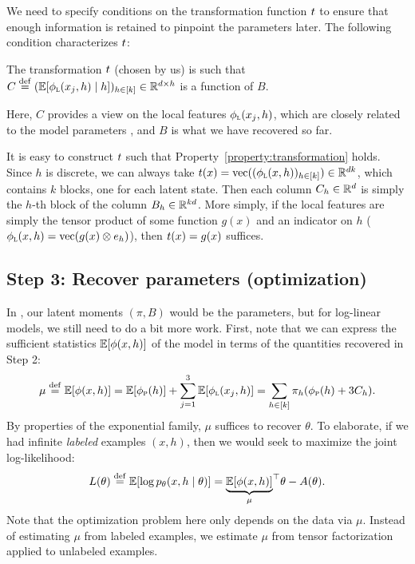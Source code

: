 We need to specify conditions on the transformation function $t$
to ensure that enough information is retained to pinpoint the parameters later.
The following condition characterizes $t$:
\begin{property}
  \label{property:transformation}
  The transformation $t$ (chosen by us) is such that $C \stackrel{\rm def}{=}
  (\mathbb{E}[\phi_\text{\sc l}(x_j, h) \mid h])_{h \in [k]} \in \mathbb{R}^{d \times h}$ is a
  function of $B$.
\end{property}
Here, $C$ provides a view on the local features $\phi_\text{\sc l}(x_j,h)$,
which are
closely related to the model parameters ,
and $B$ is what we have recovered so far.

It is easy to construct $t$ such that Property~\ref{property:transformation} holds.
Since $h$ is discrete,
we can always take $t(x) = \text{vec}((\phi_\text{\sc l}(x, h))_{h \in [k]}) \in \mathbb{R}^{dk}$,
which contains $k$ blocks, one for each latent state.
Then each column $C_h \in \mathbb{R}^d$ is simply the $h$-th block
of the column $B_h \in \mathbb{R}^{kd}$.
More simply, if
the local features are simply the tensor product of some function $g(x)$ and an
indicator on $h$ ($\phi_\text{\sc l}(x,h) = \text{vec}(g(x) \otimes e_h)$),
then $t(x) = g(x)$ suffices.

\subsection{Step 3: Recover parameters (optimization)}

In \cite{anandkumar12moments}, our latent moments $(\pi, B)$
would be the parameters, but for log-linear models,
we still need to do a bit more work.
First, note that we can express the sufficient statistics $\mathbb{E}[\phi(x,h)]$
of the model in terms of the quantities recovered in Step 2:
\begin{align}
  \mu \stackrel{\rm def}{=} \mathbb{E}[\phi(x,h)] = \mathbb{E}[\phi_\text{\sc p}(h)] + \sum_{j=1}^3 \mathbb{E}[\phi_\text{\sc l}(x_j,h)] = \sum_{h \in [k]} \pi_h (\phi_\text{\sc p}(h) + 3 C_h).
\end{align}
By properties of the exponential family, $\mu$ suffices to recover $\theta$.
To elaborate, if we had infinite \emph{labeled} examples $(x,h)$,
then we would seek to maximize the joint log-likelihood:
\begin{align}
L(\theta) \stackrel{\rm def}{=} \mathbb{E}[\log p_\theta(x, h \mid \theta)] = {\underbrace{\mathbb{E}[\phi(x,h)]}_{\mu}}^\top\theta - A(\theta).
\end{align}
Note that the optimization problem here only depends on the data via $\mu$.
Instead of estimating $\mu$ from labeled examples,
we estimate $\mu$ from tensor factorization applied to unlabeled examples.

